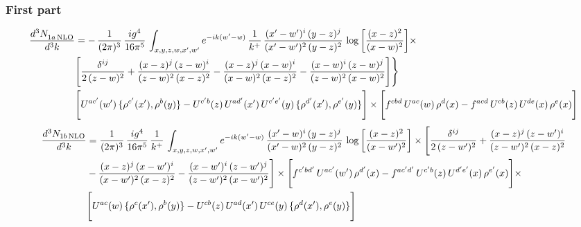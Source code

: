 \documentclass[9pt]{article}
\numberwithin{equation}{section}
\begin{document}
\subsubsection{First part}
\begin{align}
 \frac{d^{3}N_{1a\,\rm NLO}^{\rm}}{d^{3}k}  & = -\,\frac{1}{(2\pi)^{3}}\,\frac{ig^{4}}{16\pi^{5}}\,\int_{x,y,z,w,x',w^{\prime}} e^{-ik(w^{\prime}-w)}\,\frac{1}{k^{+}}\, \frac{(x'-w')^{i}\,(y-z)^{j}}{(x'-w')^{2}\,(y-z)^{2}}\,\log{\left[\frac{(x-z)^{2}}{(x-w)^{2}}\right]}\times\notag \\ &  \Bigg[\frac{\delta^{ij}}{2\,(z-w)^{2}}+\frac{(x-z)^{j}\,(z-w)^{i}}{(z-w)^{2}\,(x-z)^{2}}-\frac{(x-z)^{j}\,(x-w)^{i}}{(x-w)^{2}\,(x-z)^{2}}-\frac{(x-w)^{i}\,(z-w)^{j}}{(z-w)^{2}\,(x-w)^{2}}\Bigg]\Bigg\} \notag \\ & \Bigg[U^{ac'}(w')\,\{\rho^{c'}(x'),\rho^{b}(y)\}-U^{c'b}(z)\,U^{ad'}(x')\,U^{c'e'}(y)\, \{\rho^{d'}(x'),\rho^{e'}(y)\}\Bigg]\times \Bigg[f^{cbd}\,U^{ac}(w)\,\rho^{d}(x)-f^{acd}\, U^{cb}(z)\,U^{de}(x)\,\rho^{e}(x)\Bigg]
\end{align}
\begin{align}
\frac{d^{3}N_{1b\, \rm NLO}}{d^{3}k} & =  \frac{1}{(2\pi)^{3}}\,\frac{ig^{4}}{16\pi^{5}}\,\frac{1}{k^{+}}\,\int_{x,y,z,w,x',w^{\prime}} e^{-ik(w^{\prime}-w)}\,  \frac{(x'-w)^{i}\,(y-z)^{j}}{(x'-w)^{2}\,(y-z)^{2}}\,\log{\left[\frac{(x-z)^{2}}{(x-w')^{2}}\right]}\times \Bigg[\frac{\delta^{ij}}{2\,(z-w')^{2}}+\frac{(x-z)^{j}\,(z-w')^{i}}{(z-w')^{2}\,(x-z)^{2}}\notag \\ &  -\frac{(x-z)^{j}\,(x-w')^{i}}{(x-w')^{2}\,(x-z)^{2}} -\frac{(x-w')^{i}\,(z-w')^{j}}{(z-w')^{2}\,(x-w')^{2}}\Bigg] \times\Bigg[f^{c'bd'}\,U^{ac'}(w')\,\rho^{d'}(x)-f^{ac'd'}\, U^{c'b}(z)\,U^{d'e'}(x)\,\rho^{e'}(x)\Bigg] \times\notag \\ &  \Bigg[U^{ac}(w)\,\{\rho^{c}(x'),\rho^{b}(y)\}-U^{cb}(z)\,U^{ad}(x')\,U^{ce}(y)\, \{\rho^{d}(x'),\rho^{e}(y)\}\Bigg]
\end{align}
\end{document}
